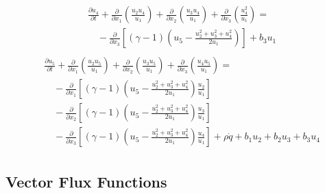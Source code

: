 \documentclass{turgon}
\begin{document}
%
\begin{align}
  \begin{aligned} &\frac{\partial u_4}{\partial t}
  + \frac{\partial}{\partial x_1}\left(\frac{u_2u_4}{u_1}\right)
  + \frac{\partial}{\partial x_2}\left(\frac{u_3u_4}{u_1}\right)
  + \frac{\partial}{\partial x_3}\left(\frac{u_4^2}{u_1}\right) = \\
  &\quad -\frac{\partial}{\partial x_3}\left[
    (\gamma-1)\left(u_5 - \frac{u_2^2+u_3^2+u_4^2}{2u_1}\right)
    \right] + b_3u_1
  \end{aligned}
  \label{e:euler:gov4}
\end{align}
%
\begin{align}
  \begin{aligned} &\frac{\partial u_5}{\partial t}
  + \frac{\partial}{\partial x_1}\left(\frac{u_2u_5}{u_1}\right)
  + \frac{\partial}{\partial x_2}\left(\frac{u_3u_5}{u_1}\right)
  + \frac{\partial}{\partial x_3}\left(\frac{u_4u_5}{u_1}\right) = \\
  &\quad - \frac{\partial}{\partial x_1}\left[
    (\gamma-1)\left(u_5 - \frac{u_2^2+u_3^2+u_4^2}{2u_1}\right)
    \frac{u_2}{u_1}
    \right] \\
  &\quad - \frac{\partial}{\partial x_2}\left[
    (\gamma-1)\left(u_5 - \frac{u_2^2+u_3^2+u_4^2}{2u_1}\right)
    \frac{u_3}{u_1}
    \right] \\
  &\quad - \frac{\partial}{\partial x_3}\left[
    (\gamma-1)\left(u_5 - \frac{u_2^2+u_3^2+u_4^2}{2u_1}\right)
    \frac{u_4}{u_1}
    \right]
  + \rho\dot{q} + b_1u_2 + b_2u_3 + b_3u_4
  \end{aligned}
  \label{e:euler:gov5}
\end{align}

\subsection{Vector Flux Functions}
\end{document}
